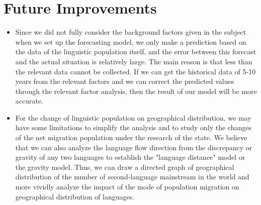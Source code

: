 \section{Future Improvements}

\begin{itemize}
\item Since we did not fully consider the background factors given in the subject when we set up the forecasting model, we only make a prediction based on the data of the linguistic population itself, and the error between this forecast and the actual situation is relatively large. The main reason is that less than the relevant data cannot be collected. If we can get the historical data of 5-10 years from the relevant factors and we can correct the predicted values through the relevant factor analysis, then the result of our model will be more accurate.\\
\item For the change of linguistic population on geographical distribution, we may have some limitations to simplify the analysis and to study only the changes of the net migration population under the research of the state. We believe that we can also analyze the language flow direction from the discrepancy or gravity of any two languages to establish the "language distance" model or the gravity model. Thus, we can draw a directed graph of geographical distribution of the number of second-language mainstream in the world and more vividly analyze the impact of the mode of population migration on geographical distribution of languages.
\end{itemize}